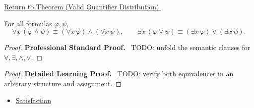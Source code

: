 \newpage
{}
\label{prf:qdist}

\begin{remark*}[Return]
\hyperref[thm:qdist]{Return to Theorem (Valid Quantifier Distribution).}
\end{remark*}

\begin{theorem*}
For all formulas \(\varphi,\psi\),
\[
\forall x\,(\varphi\land\psi)\equiv(\forall x\,\varphi)\land(\forall x\,\psi),
\qquad
\exists x\,(\varphi\lor\psi)\equiv(\exists x\,\varphi)\lor(\exists x\,\psi).
\]
\end{theorem*}

\begin{proof}
\textbf{Professional Standard Proof.}~
TODO: unfold the semantic clauses for \(\forall,\exists,\land,\lor\).
\end{proof}

\begin{proof}
\textbf{Detailed Learning Proof.}~
TODO: verify both equivalences in an arbitrary structure and assignment.
\end{proof}

\begin{remark*}
\end{remark*}

\begin{dependencies}
\begin{itemize}
  \item \hyperref[def:fol-satisfaction]{Satisfaction}
\end{itemize}
\end{dependencies}

\clearpage
